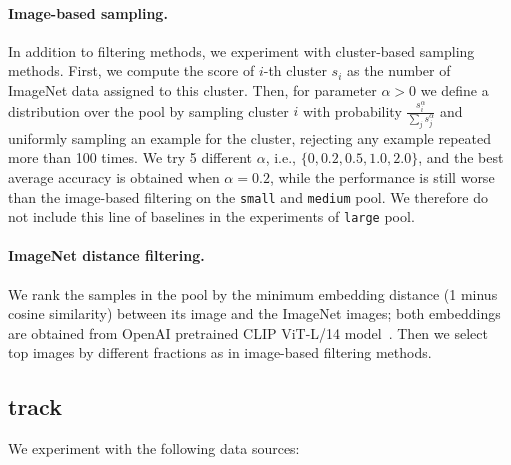 \paragraph{Image-based sampling.}
In addition to filtering methods, we experiment with cluster-based sampling methods. First, we compute the score of $i$-th cluster $s_i$ as the number of ImageNet data assigned to this cluster. Then, for parameter $\alpha>0$ we define a distribution over the pool by sampling cluster $i$ with probability $\frac{s_i^\alpha}{\sum_{j} s_j^\alpha}$ and uniformly sampling an example for the cluster, rejecting any example repeated more than 100 times. We try 5 different $\alpha$, i.e., $\{0, 0.2, 0.5, 1.0, 2.0\}$, and the best average accuracy is obtained when $\alpha=0.2$, while the performance is still worse than the image-based filtering on the \texttt{small} and \texttt{medium} pool. We therefore do not include this line of baselines in the experiments of \texttt{large} pool.


\paragraph{ImageNet distance filtering.}
We rank the samples in the pool by the minimum embedding distance (1 minus cosine similarity) between its image and the ImageNet images; both embeddings are obtained from OpenAI pretrained CLIP ViT-L/14 model~\citep{radford2021learning}. Then we select top images by different fractions as in image-based filtering methods.

\subsection{\byod track}
\label{app:byod}

We experiment with the following data sources:


